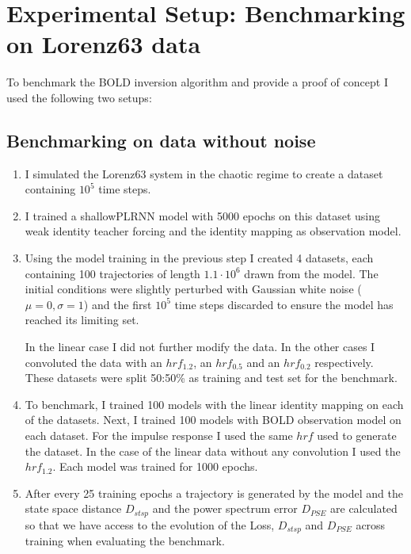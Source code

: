 \FloatBarrier
\section{Experimental Setup: Benchmarking on Lorenz63 data}

To benchmark the BOLD inversion algorithm and provide a proof of concept I used the following two setups:

\subsection{Benchmarking on data without noise}\label{sec:noiseless_lorenz}
\begin{enumerate}
    \item I simulated the Lorenz63 system in the chaotic regime to create a dataset containing $10^5$ time steps.
    
    \item I trained a shallowPLRNN model with 5000 epochs on this dataset using weak identity teacher forcing and the identity mapping as observation model.

    \item Using the model training in the previous step I created 4 datasets, each containing 100 trajectories of length $1.1 \cdot 10^6$ drawn from the model. The initial conditions
          were slightly perturbed with Gaussian white noise ($\mu=0, \sigma=1$) and the first $10^5$ time steps discarded to ensure the model has reached its limiting set.

          In the linear case I did not further modify the data. In the other cases I convoluted the data with an $hrf_{1.2}$, an $hrf_{0.5}$ and an $hrf_{0.2}$ respectively.
          These datasets were split 50:50\% as training and test set for the benchmark.

    \item To benchmark, I trained 100 models with the linear identity mapping on each of the datasets. Next, I trained 100 models with BOLD observation model on each dataset.
          For the impulse response I used the same $hrf$ used to generate the dataset. In the case of the linear data without any convolution I used the $hrf_{1.2}$. 
          Each model was trained for 1000 epochs.

    \item After every 25 training epochs a trajectory is generated by the model and the state space distance $D_{stsp}$ and the power spectrum error $D_{PSE}$ are calculated
          so that we have access to the evolution of the Loss, $D_{stsp}$ and $D_{PSE}$ across training when evaluating the benchmark.
\end{enumerate}

